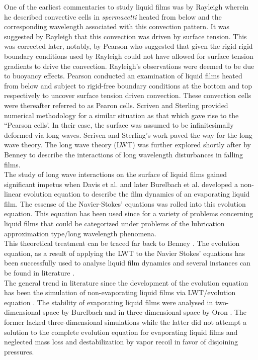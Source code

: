 \documentclass[a4paper,12pt]{article}
\begin{document}
One of the earliest commentaries to study liquid films was by Rayleigh\citep{Rayleigh1916a} wherein he described convective cells in \emph{spermacetti} heated from below and the corresponding wavelength associated with this convection pattern. It was suggested by Rayleigh that this convection was driven by surface tension. This was corrected later, notably, by Pearson \citep{Pearson1958a} who suggested that given the rigid-rigid boundary conditions used by Rayleigh could not have allowed for surface tension gradients to drive the convection. Rayleigh's observations were deemed to be due to buoyancy effects. Pearson conducted an examination of liquid films heated from below and subject to rigid-free boundary conditions at the bottom and top respectively to uncover surface tension driven convection. These convection cells were thereafter referred to as Pearon cells. Scriven and Sterling provided numerical methodology for a similar situation as that which gave rise to the ``Pearson cells'.  In their case, the surface was assumed to be infinitesimally deformed via long waves. Scriven and Sterling's work paved the way for the long wave theory. The long wave theory (LWT) was further explored shortly after by Benney \citep{Benny1966a, Benny1966b} to describe the interactions of long wavelength disturbances in falling films.\\

The study of long wave interactions on the surface of liquid films gained significant impetus when Davis et al. \citep{WandD} and later Burelbach et al.\citep{Burelbach} developed a non-linear evolution equation to describe the film dynamics of an evaporating liquid film. The essense of the Navier-Stokes' equations was rolled into this evolution equation. This equation has been used since for a variety of problems concerning liquid films that could be categorized under problems of the lubrication approximation type/long wavelength phenomena.\\

This theoretical treatment can be traced far back to Benney \citep{Benny1966b}. The evolution equation, as a result of applying the LWT to the Navier Stokes' equations has been successfully used to analyse liquid film dynamics and several instances can be found in literature \citep{Krishnamoorthy1995a, Vanhook1997a, Oron1997a, Oron2000b}.\\

The general trend in literature since the development of the evolution equation has been the simulation of non-evaporating liquid films via LWT/evolution equation \citep{Krishnamoorthy1995a, Vanhook1997a, Oron2000b, Sultan2005a, Dietzel2009a}. The stability of evaporating liquid films were analysed in two-dimensional space by Burelbach \cite{Burelbach} and in three-dimensional space by Oron \citep{Oron2000b, Oron2000c}. The former lacked three-dimensional simulations while the latter did not attempt a solution to the complete evolution equation for evaporating liquid films and neglected  mass loss and destabilization by vapor recoil in favor of disjoining pressures.\\
\end{document}
